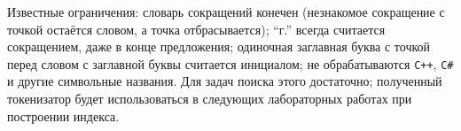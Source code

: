 Известные ограничения: словарь сокращений конечен (незнакомое сокращение с точкой
остаётся словом, а точка отбрасывается); \enquote{г.} всегда считается сокращением,
даже в конце предложения; одиночная заглавная буква с точкой перед словом с
заглавной буквы считается инициалом; не обрабатываются \texttt{C++}, \texttt{C\#}
и другие символьные названия. Для задач поиска этого достаточно; полученный
токенизатор будет использоваться в следующих лабораторных работах при построении
индекса.
